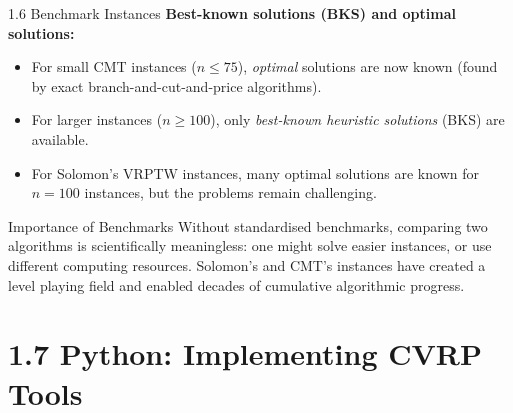 \documentclass[aspectratio=169,10pt]{beamer}
\begin{document}
\begin{frame}[allowframebreaks]{1.6 Benchmark Instances}
\textbf{Best-known solutions (BKS) and optimal solutions:}
\begin{itemize}
  \item For small CMT instances ($n \leq 75$), \emph{optimal} solutions are now known
        (found by exact branch-and-cut-and-price algorithms).
  \item For larger instances ($n \geq 100$), only \emph{best-known heuristic solutions}
        (BKS) are available.
  \item For Solomon's VRPTW instances, many optimal solutions are known for $n=100$
        instances, but the problems remain challenging.
\end{itemize}

\begin{alertblock}{Importance of Benchmarks}
Without standardised benchmarks, comparing two algorithms is scientifically
meaningless: one might solve easier instances, or use different computing resources.
Solomon's and CMT's instances have created a level playing field and enabled decades
of cumulative algorithmic progress.
\end{alertblock}

\end{frame}

\section{1.7 Python: Implementing CVRP Tools}
\end{document}
